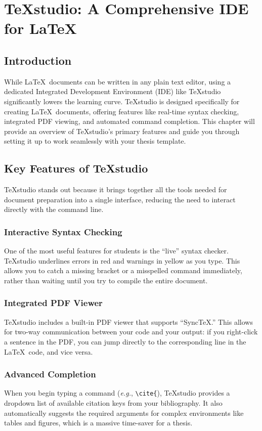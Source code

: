 \chapter{TeXstudio: A Comprehensive IDE for \LaTeX}\label{ch:texstudio}
	\section{Introduction}\label{sec:TSIntroduction}
		While \LaTeX\ documents can be written in any plain text editor, using a dedicated Integrated Development Environment (IDE) like TeXstudio significantly lowers the learning curve. 
		TeXstudio is designed specifically for creating \LaTeX\ documents, offering features like real-time syntax checking, integrated PDF viewing, and automated command completion.
		This chapter will provide an overview of TeXstudio's primary features and guide you through setting it up to work seamlessly with your thesis template.
	
	\section{Key Features of TeXstudio}
		TeXstudio stands out because it brings together all the tools needed for document preparation into a single interface, reducing the need to interact directly with the command line.
		
		\subsection{Interactive Syntax Checking}
			One of the most useful features for students is the \enquote{live} syntax checker. 
			TeXstudio underlines errors in red and warnings in yellow as you type. 
			This allows you to catch a missing bracket or a misspelled command immediately, rather than waiting until you try to compile the entire document.
		
		\subsection{Integrated PDF Viewer}
			TeXstudio includes a built-in PDF viewer that supports \enquote{SyncTeX.} 
			This allows for two-way communication between your code and your output: if you right-click a sentence in the PDF, you can jump directly to the corresponding line in the \LaTeX\ code, and vice versa.
		
		\subsection{Advanced Completion}
			When you begin typing a command (\textit{e.g.}, \texttt{\textbackslash cite\{}), TeXstudio provides a dropdown list of available citation keys from your bibliography. 
			It also automatically suggests the required arguments for complex environments like tables and figures, which is a massive time-saver for a thesis.
		
